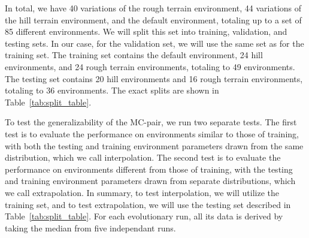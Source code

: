         In total, we have 40 variations of the rough terrain environment, 44 variations of the hill terrain environment, and the default environment, totaling up to a set of 85 different environments. We will split this set into training, validation, and testing sets. In our case, for the validation set, we will use the same set as for the training set. The training set contains the default environment, 24 hill environments, and 24 rough terrain environments, totaling to 49 environments. The testing set contains 20 hill environments and 16 rough terrain environments, totaling to 36 environments. The exact splits are shown in Table~\ref{tab:split_table}.

        To test the generalizability of the MC-pair, we run two separate tests. The first test is to evaluate the performance on environments similar to those of training, with both the testing and training environment parameters drawn from the same distribution, which we call interpolation. The second test is to evaluate the performance on environments different from those of training, with the testing and training environment parameters drawn from separate distributions, which we call extrapolation. In summary, to test interpolation, we will utilize the training set, and to test extrapolation, we will use the testing set described in Table~\ref{tab:split_table}. For each evolutionary run, all its data is derived by taking the median from five independant runs. 

